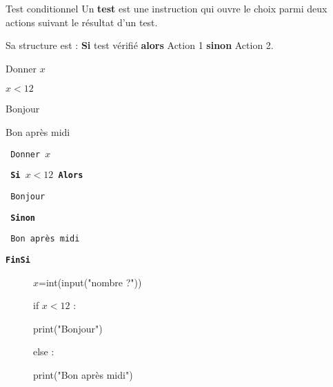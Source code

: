  


\begin{DefT}{Test conditionnel}
Un  \textbf{test}   est une instruction qui ouvre le choix parmi deux actions suivant le résultat d'un test.

Sa structure est : \textbf{Si} test vérifié \textbf{alors} Action 1 \textbf{sinon} Action 2.
\end{DefT}



\begin{minipage}[t]{0.31\linewidth}
\begin{Ex}
\begin{description}
\item Donner $x$
\item[Test :] $x<12$
\item[Action 1 :] Bonjour
\item[Action 2 :] Bon après midi
\end{description}
\end{Ex}
\end{minipage}
\hfill
\begin{minipage}[t]{0.31\linewidth}
\begin{Syn}
\texttt{ Donner $x$}

\texttt{ \textbf{Si} $x<12$ \textbf{Alors}}

\texttt{ \hspace{0.5cm}	 Bonjour }

\texttt{ \textbf{Sinon}}

\texttt{\hspace{0.5cm}	Bon après midi }
   	
\texttt{\textbf{FinSi}}

\end{Syn}
\end{minipage}
\hfill
\begin{minipage}[t]{0.31\linewidth}

\begin{Cod}
\begin{description}
\item[] $x$=int(input("nombre ?"))
\item[] if  $x<12$ :
\item[] \hspace{0.5cm} print("Bonjour")
\item[] else :
\item[] \hspace{0.5cm} print("Bon après midi")
\end{description}
\end{Cod}
\end{minipage}


